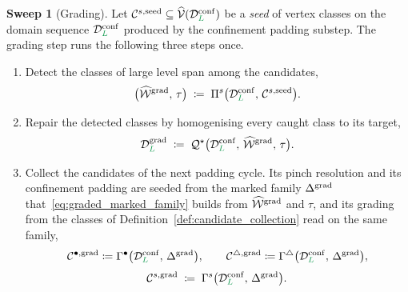 \documentclass[a4paper, 12pt]{article}
\makeatletter
\newcommand{\quadriV}{\mathcal{Q}^{\star}}                       %
\newcommand{\detectG}{\Pi^{s}}                                   %
\newcommand{\collectV}{\Gamma^{\bullet}}                         %
\newcommand{\collectF}{\Gamma^{\triangle}}                       %
\newcommand{\collectC}{\Gamma^{s}}                               %
\DeclareRobustCommand{\candV}[1][]{\mathcal{C}^{\bullet\ifx\@empty#1\@empty\else,#1\fi}}
\DeclareRobustCommand{\candF}[1][]{\mathcal{C}^{\triangle\ifx\@empty#1\@empty\else,#1\fi}}
\DeclareRobustCommand{\candC}[1][]{\mathcal{C}^{s\ifx\@empty#1\@empty\else,#1\fi}}
\newcommand{\quadriVup}[1]{\quadriV_{\rightarrow #1}}            %
\newcommand{\targetlevel}{\tau}                                 %
\newcommand{\green}{\color{ForestGreen}}
\newcommand{\V}{\mathcal{V}}
\DeclareRobustCommand{\simplexsubsetTwo}[2][]{\Delta\ifx\@empty#1\@empty\else^{#1}\fi_{#2}}
\newcommand{\vertexClasses}{\widehat{\V}}
\DeclareRobustCommand{\markedVertexClasses}[1][]{\widehat{\mathcal{W}}\ifx\@empty#1\@empty\else^{#1}\fi}
\renewcommand{\L}{{\green L}}
\theoremstyle{definition}
\newtheorem{sweep}[theorem]{Sweep}
\theoremstyle{plain}
\numberwithin{equation}{section}
\newcommand{\tobecut}[1]{{\color{red} #1}}     %
\DeclareRobustCommand{\domseq}[1][]{\mathcal{D}\ifx\@empty#1\@empty\else_{#1}\fi}
\makeatother
\begin{document}
\begin{sweep}[Grading]
\label{sw:grading_sweep}
    Let $\candC[\mathrm{seed}] \subseteq \vertexClasses(\domseq[\L]^{\mathrm{conf}})$ be a \emph{seed} of vertex classes on the domain sequence $\domseq[\L]^{\mathrm{conf}}$ produced by the confinement padding substep. The grading step runs the following three steps once.
    \begin{enumerate}[topsep=3pt, itemsep=-2pt]
    \item Detect the classes of large level span among the candidates,
    \begin{equation}
        \label{eq:grading_sweep_detection}
        \big( \markedVertexClasses[\mathrm{grad}], \, \targetlevel \big) \; \coloneq \; \detectG \big( \domseq[\L]^{\mathrm{conf}}, \, \candC[\mathrm{seed}] \big).
    \end{equation}
    \vspace{-7mm}
    \item Repair the detected classes by homogenising every caught class to its target,
    \begin{equation}
        \label{eq:grading_sweep_repair}
        \domseq[\L]^{\mathrm{grad}} \; \coloneq \; \quadriV \big( \domseq[\L]^{\mathrm{conf}}, \, \markedVertexClasses[\mathrm{grad}], \, \targetlevel \big).
    \end{equation}
    \item Collect the candidates of the next padding cycle. Its pinch resolution and its confinement padding are seeded from the marked family $\simplexsubsetTwo[\mathrm{grad}]{}$ that~\eqref{eq:graded_marked_family} builds from $\markedVertexClasses[\mathrm{grad}]$ and $\targetlevel$, and its grading from the classes of Definition~\ref{def:candidate_collection} read on the same family,
    \begin{equation}
        \label{eq:grading_sweep_candidates}
        \candV[\mathrm{grad}] \coloneq \collectV \big( \domseq[\L]^{\mathrm{conf}}, \, \simplexsubsetTwo[\mathrm{grad}]{} \big),
        \qquad
        \candF[\mathrm{grad}] \coloneq \collectF \big( \domseq[\L]^{\mathrm{conf}}, \, \simplexsubsetTwo[\mathrm{grad}]{} \big),
    \end{equation}
    \vspace{-5mm}
    \begin{equation}
        \label{eq:grading_sweep_classes}
        \candC[\mathrm{grad}] \; \coloneq \; \collectC \big( \domseq[\L]^{\mathrm{conf}}, \, \simplexsubsetTwo[\mathrm{grad}]{} \big) .
    \end{equation}
\end{enumerate}
\end{sweep}
\end{document}
